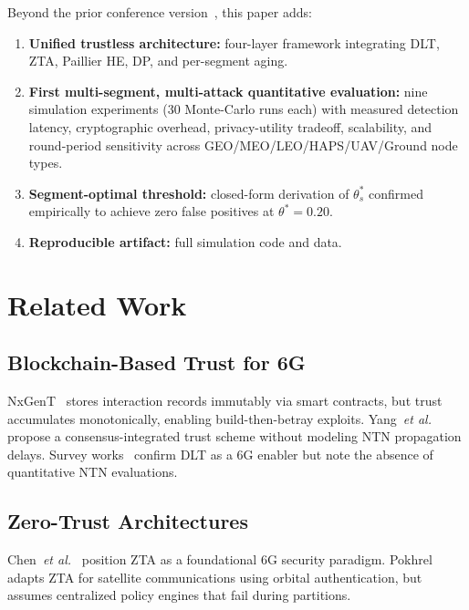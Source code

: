 \documentclass[journal,twoside,10pt]{IEEEtran}
\begin{document}
Beyond the prior conference version~\cite{conf_version}, this paper adds:
\begin{enumerate}
  \item \textbf{Unified trustless architecture:} four-layer framework
        integrating DLT, ZTA, Paillier HE, DP, and per-segment aging.
  \item \textbf{First multi-segment, multi-attack quantitative evaluation:}
        nine simulation experiments (30 Monte-Carlo runs each) with
        measured detection latency, cryptographic overhead,
        privacy-utility tradeoff, scalability, and round-period
        sensitivity across GEO/MEO/LEO/HAPS/UAV/Ground node types.
  \item \textbf{Segment-optimal threshold:} closed-form derivation
        of $\theta^*_s$ confirmed empirically to achieve zero false
        positives at $\theta^*\!=\!0.20$.
  \item \textbf{Reproducible artifact:} full simulation code and data.
\end{enumerate}

\section{Related Work}
\label{sec:related}

\subsection{Blockchain-Based Trust for 6G}

NxGenT~\cite{nxgent} stores interaction records immutably via smart
contracts, but trust accumulates monotonically, enabling
build-then-betray exploits.
Yang~\textit{et al.}~\cite{yang2024} propose a consensus-integrated
trust scheme without modeling NTN propagation delays.
Survey works~\cite{kalla2022,khan2023} confirm DLT as a 6G enabler
but note the absence of quantitative NTN evaluations.

\subsection{Zero-Trust Architectures}

Chen~\textit{et al.}~\cite{chen2024} position ZTA as a foundational
6G security paradigm.
Pokhrel~\cite{ztisl} adapts ZTA for satellite communications using
orbital authentication, but assumes centralized policy engines that
fail during partitions.
\end{document}
